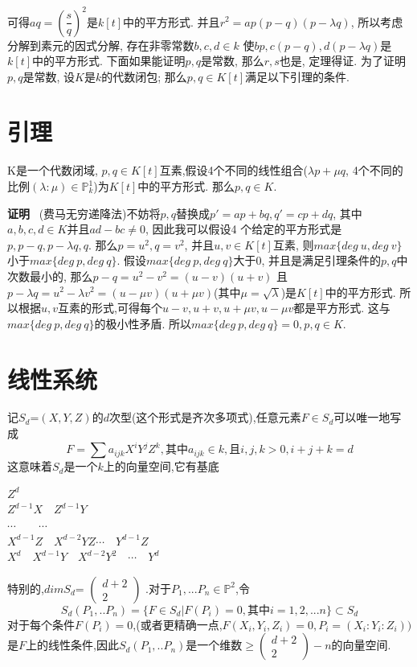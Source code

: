 \documentclass[UTF8]{book}
\begin{document}
		
		可得$aq=(\dfrac{s}{q})^{2}$是$ k[t] $中的平方形式. 并且$r^{2}=ap(p-q)(p-\lambda q)$, 所以考虑分解到素元的因式分解, 存在非零常数$b,c,d\in k $ 使$bp,c(p-q),d(p-\lambda q)$是$ k[t] $中的平方形式. 下面如果能证明$ p, q $是常数, 那么$ r, s $也是, 定理得证. 为了证明$ p, q $是常数, 设$ K $是$ k $的代数闭包; 那么$p,q\in K[t]$满足以下引理的条件.

	\section{引理}
		K是一个代数闭域, $p,q\in K[t]$互素,假设4个不同的线性组合($\lambda p+\mu q$, 4个不同的比例$(\lambda:\mu)\in \mathbb{P}^{1}_{k}$)为$ K[t] $中的平方形式. 那么$p,q\in K$.
		
		
		\textbf{证明} \ (费马无穷递降法)不妨将$ p,q $替换成$ p'=ap+bq,q'=cp+dq $, 其中$a,b,c,d\in K$并且$ad-bc\neq 0$, 因此我可以假设4 个给定的平方形式是$p,p-q,p-\lambda q,q$. 那么$p=u^{2},q=v^{2}$, 并且$u,v\in K[t]$互素, 则$max\{deg\ u,deg\ v\}$小于$max\{deg\ p,deg\ q\}$. 假设$max\{deg\ p,deg\ q\}$大于0, 并且是满足引理条件的$ p,q $中次数最小的, 那么$p-q=u^{2}-v^{2}=(u-v)(u+v)$ 且$p-\lambda q=u^{2}-\lambda v^{2}=(u-\mu v)(u+\mu v)$(其中$\mu=\sqrt{\lambda}$)是$ K[t] $中的平方形式. 所以根据$ u,v $互素的形式,可得每个$u-v,u+v,u+\mu v,u-\mu v$都是平方形式. 这与$ max\{deg\ p,deg\ q\} $的极小性矛盾. 所以$max\{deg\ p,deg\ q\}=0, p,q\in K.$
	\section{线性系统}
		记$S_{d}$={$ (X,Y,Z) $的$ d $次型}(这个形式是齐次多项式),任意元素$F \in S_{d}$可以唯一地写成
		\begin{equation*}
		F=\sum a_{ijk} X^{i}Y^{j}Z^{k},\text{其中}a_{ijk} \in k,\text{且}i,j,k > 0,i+j+k=d
		\end{equation*}
		这意味着$S_{d}$是一个$ k $上的向量空间,它有基底
		\begin{center}
		$Z^{d}$\\
		$Z^{d-1}X  \quad Z^{d-1}Y$\\
		$ \cdots    \qquad        \cdots $\\
		$X^{d-1}Z  \quad X^{d-2}YZ  \cdots  \quad Y^{d-1}Z$\\
		$X^{d}\quad X^{d-1}Y  \quad X^{d-2}Y^{2}\quad   \cdots  \quad Y^{d}$\\
		\end{center}
		特别的,$dimS_{d}$=
		$\begin{pmatrix}
		     d+2  \\
		      2
		\end{pmatrix}$
		.对于$P_{1},...P_{n} \in \mathbb{P}^{2}$,令
		\begin{equation*}
		S_{d}(P_{1},..P_{n})=\{F\in S_{d}|F(P_{i})=0,\text{其中}i=1,2,...n\} \subset S_{d}
		\end{equation*}
		对于每个条件$ F(P_{i})=0 $,(或者更精确一点,$ F(X_{i},Y_{i},Z_{i})=0,P_{i}=(X_{i}:Y_{i}:Z_{i})) $
		是$ F $上的线性条件,因此$S_{d}(P_{1},..P_{n})$是一个维数$\geq\left(\begin{array}{c}{d+2} \\ {2}\end{array}\right)-n$的向量空间.
\end{document}
